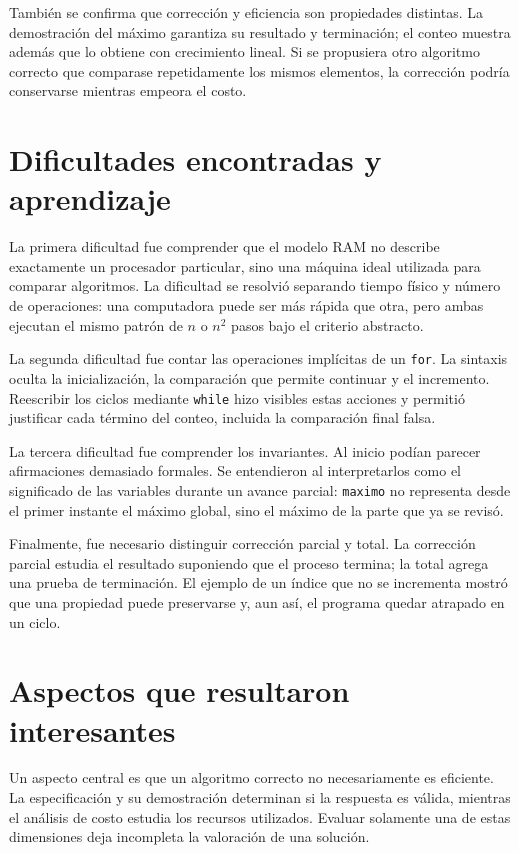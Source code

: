 \documentclass[12pt,letterpaper]{article}
\newcommand{\codigo}[1]{\texttt{#1}}
\begin{document}
También se confirma que corrección y eficiencia son propiedades distintas. La demostración del máximo garantiza su resultado y terminación; el conteo muestra además que lo obtiene con crecimiento lineal. Si se propusiera otro algoritmo correcto que comparase repetidamente los mismos elementos, la corrección podría conservarse mientras empeora el costo.

\section{Dificultades encontradas y aprendizaje}

La primera dificultad fue comprender que el modelo RAM no describe exactamente un procesador particular, sino una máquina ideal utilizada para comparar algoritmos. La dificultad se resolvió separando tiempo físico y número de operaciones: una computadora puede ser más rápida que otra, pero ambas ejecutan el mismo patrón de $n$ o $n^2$ pasos bajo el criterio abstracto.

La segunda dificultad fue contar las operaciones implícitas de un \codigo{for}. La sintaxis oculta la inicialización, la comparación que permite continuar y el incremento. Reescribir los ciclos mediante \codigo{while} hizo visibles estas acciones y permitió justificar cada término del conteo, incluida la comparación final falsa.

La tercera dificultad fue comprender los invariantes. Al inicio podían parecer afirmaciones demasiado formales. Se entendieron al interpretarlos como el significado de las variables durante un avance parcial: \codigo{maximo} no representa desde el primer instante el máximo global, sino el máximo de la parte que ya se revisó.

Finalmente, fue necesario distinguir corrección parcial y total. La corrección parcial estudia el resultado suponiendo que el proceso termina; la total agrega una prueba de terminación. El ejemplo de un índice que no se incrementa mostró que una propiedad puede preservarse y, aun así, el programa quedar atrapado en un ciclo.

\section{Aspectos que resultaron interesantes}

Un aspecto central es que un algoritmo correcto no necesariamente es eficiente. La especificación y su demostración determinan si la respuesta es válida, mientras el análisis de costo estudia los recursos utilizados. Evaluar solamente una de estas dimensiones deja incompleta la valoración de una solución.
\end{document}
